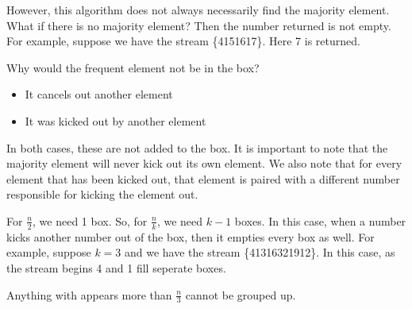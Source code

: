 \documentclass[11pt]{article}
\begin{document}
However, this algorithm does not always necessarily find the majority element. What if there is no majority element? Then the number returned is not empty. For example, suppose we have the stream \{4151617\}. Here 7 is returned.

\smallskip

Why would the frequent element not be in the box?
\begin{itemize}

	\item It cancels out another element
	
	\item It was kicked out by another element

\end{itemize}

In both cases, these are not added to the box. It is important to note that the majority element will never kick out its own element. We also note that for every element that has been kicked out, that element is paired with a different number responsible for kicking the element out.


For $\frac{n}{2}$, we need 1 box. So, for $\frac{n}{k}$, we need $k - 1$ boxes. In this case, when a number kicks another number out of the box, then it empties every box as well. For example, suppose $k = 3$ and we have the stream \{41316321912\}. In this case, as the stream begins 4 and 1 fill seperate boxes. 

\smallskip

Anything with appears more than $\frac{n}{3}$ cannot be grouped up.
\end{document}

